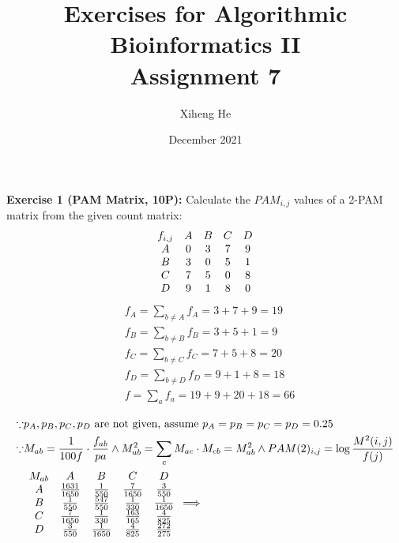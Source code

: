 \documentclass{article}
\title{Exercises for Algorithmic Bioinformatics II\\
Assignment 7}
\author{Xiheng He}
\date{December 2021}
\begin{document}
{\let\newpage\relax\maketitle}
\begin{flushleft}
\textbf{Exercise 1 (PAM Matrix, 10P):}
\newline
Calculate the $PAM_{i,j}$ values of a 2-PAM matrix from the given count matrix:
\begin{equation*}
\begin{array}{c c c c c}
f_{i,j} & A & B & C & D \\
A & 0 & 3 & 7 & 9 \\
B & 3 & 0 & 5 & 1 \\
C & 7 & 5 & 0 & 8 \\
D & 9 & 1 & 8 & 0 
\end{array} 
\end{equation*}
\begin{align*}
    & f_A = \sum_{b \neq A}f_A = 3 + 7 + 9 = 19 \\
    & f_B = \sum_{b \neq B}f_B = 3 + 5 + 1 = 9 \\
    & f_C = \sum_{b \neq C}f_C = 7 + 5 + 8 = 20 \\
    & f_D = \sum_{b \neq D}f_D = 9 + 1 + 8 = 18 \\
    & f = \sum_a f_a = 19 + 9 + 20 + 18 = 66 \\
\end{align*}
\begin{align*}
    \because & p_A,p_B,p_C,p_D \text{ are not given, assume }p_A = p_B = p_C = p_D = 0.25 \\
    \because & M_{ab} = \frac{1}{100f} \cdot \frac{f_{ab}}{pa} \land  M^2_{ab} = \sum_c M_{ac} \cdot M_{cb} = M^2_{ab} \land PAM(2)_{i,j} = \log \frac{M^2(i,j)}{f(j)}\\
    & 
    \begin{array}{c c c c c}
        M_{ab} & A & B & C & D \\
        A & \frac{1631}{1650} & \frac{1}{550} & \frac{7}{1650} & \frac{3}{550} \\
        B & \frac{1}{550} & \frac{547}{550} & \frac{1}{330} & \frac{1}{1650} \\
        C & \frac{7}{1650} & \frac{1}{330} & \frac{163}{165} & \frac{4}{825} \\
        D & \frac{3}{550} & \frac{1}{1650} & \frac{4}{825} & \frac{272}{275}
    \end{array} \Longrightarrow

\end{align*}
\end{flushleft}
\end{document}
